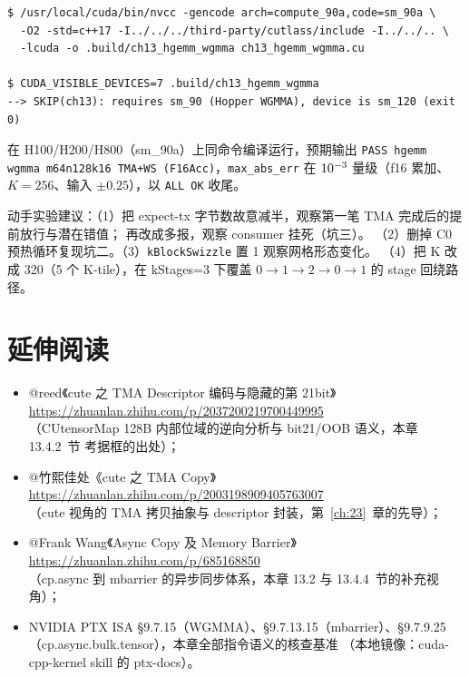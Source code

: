 \begin{lstlisting}[style=console]
$ /usr/local/cuda/bin/nvcc -gencode arch=compute_90a,code=sm_90a \
  -O2 -std=c++17 -I../../../third-party/cutlass/include -I../../.. \
  -lcuda -o .build/ch13_hgemm_wgmma ch13_hgemm_wgmma.cu

$ CUDA_VISIBLE_DEVICES=7 .build/ch13_hgemm_wgmma
--> SKIP(ch13): requires sm_90 (Hopper WGMMA), device is sm_120 (exit 0)
\end{lstlisting}

在 H100/H200/H800（sm\_90a）上同命令编译运行，预期输出
\texttt{PASS hgemm wgmma m64n128k16 TMA+WS (F16Acc)}，\texttt{max\_abs\_err}
在 $10\sp{-3}$ 量级（f16 累加、$K = 256$、输入 $\pm 0.25$），以 \texttt{ALL OK}
收尾。

动手实验建议：（1）把 expect-tx 字节数故意减半，观察第一笔 TMA 完成后的提前放行与潜在错值；
再改成多报，观察 consumer 挂死（坑三）。
（2）删掉 C0 预热循环复现坑二。（3）\texttt{k\allowbreak{}Block\allowbreak{}Swizzle} 置 1 观察网格形态变化。
（4）把 K 改成 320（5 个 K-tile），在 kStages=3 下覆盖 $0\to1\to2\to0\to1$ 的 stage 回绕路径。

\section*{延伸阅读}

\begin{itemize}
  \item @reed《cute 之 TMA Descriptor 编码与隐藏的第 21bit》\\
        \url{https://zhuanlan.zhihu.com/p/2037200219700449995}\\
        （CUtensorMap 128B 内部位域的逆向分析与 bit21/OOB 语义，本章 13.4.2~节
        考据框的出处）；
  \item @竹熙佳处《cute 之 TMA Copy》\\
        \url{https://zhuanlan.zhihu.com/p/2003198909405763007}\\
        （cute 视角的 TMA 拷贝抽象与 descriptor 封装，第~\ref{ch:23}~章的先导）；
  \item @Frank Wang《Async Copy 及 Memory Barrier》\\
        \url{https://zhuanlan.zhihu.com/p/685168850}\\
        （cp.async 到 mbarrier 的异步同步体系，本章 13.2 与 13.4.4~节的补充视角）；
  \item NVIDIA PTX ISA §9.7.15（WGMMA）、§9.7.13.15（mbarrier）、§9.7.9.25
        （cp.async.bulk.tensor），本章全部指令语义的核查基准
        （本地镜像：cuda-cpp-kernel skill 的 ptx-docs）。
\end{itemize}
